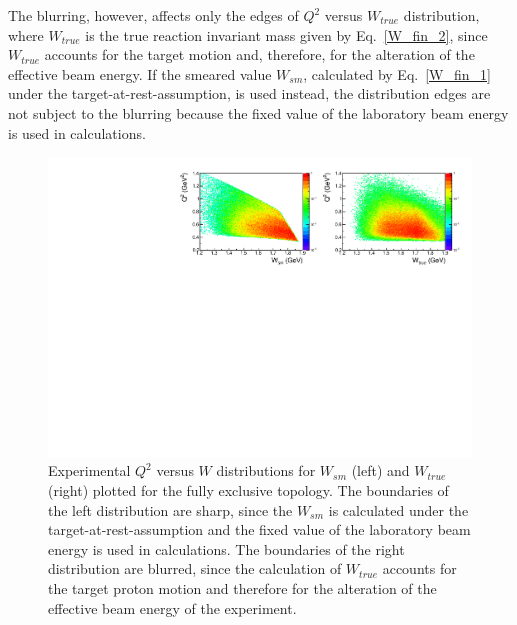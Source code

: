 
The blurring, however, affects only the edges of $Q^{2}$ versus $W_{true}$ distribution, where $W_{true}$ is the true reaction invariant mass given by Eq.~\eqref{W_fin_2}, since $W_{true}$ accounts for the target motion and, therefore, for the alteration of the effective beam energy. If the smeared value $W_{sm}$, calculated by Eq.~\eqref{W_fin_1} under the target-at-rest-assumption, is used instead, the distribution edges are not subject to the blurring because the fixed value of the laboratory beam energy is used in calculations.

\begin{figure}[htp]
\begin{center}
\includegraphics[width=16.5cm]{pictures/cross_section/blurring.pdf}
\caption{\small Experimental $Q^2$ versus $W$ distributions for $W_{sm}$ (left) and $W_{true}$ (right) plotted for the fully exclusive topology. The boundaries of the left distribution are sharp, since the $W_{sm}$ is calculated under the target-at-rest-assumption and the fixed value of the laboratory beam energy is used in calculations. The boundaries of the right distribution are blurred, since the calculation of $W_{true}$ accounts for the target proton motion and therefore for the alteration of the effective beam energy of the experiment.} \label{fig:blurring}
\end{center}
\end{figure}

